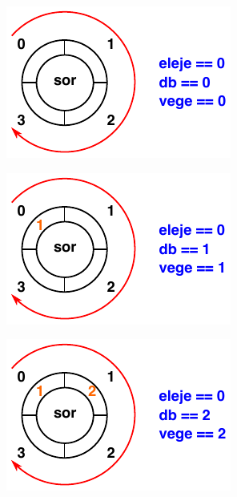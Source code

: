 \documentclass[usenames,dvipsnames,aspectratio=169]{beamer}
\begin{document}
\begin{frame}
  \footnotesize
  \begin{exampleblock}{}
    
  \end{exampleblock}
\end{frame}

\begin{frame}
  \scriptsize
  \begin{exampleblock}{}
    
  \end{exampleblock}
\end{frame}

\begin{frame}
  \begin{center}
    \includegraphics[scale=1.5]{sor/sor01.pdf}
  \end{center}
\end{frame}

\begin{frame}
  \begin{center}
    \includegraphics[scale=1.5]{sor/sor02.pdf}
  \end{center}
\end{frame}

\begin{frame}
  \begin{center}
    \includegraphics[scale=1.5]{sor/sor03.pdf}
  \end{center}
\end{frame}
\end{document}
